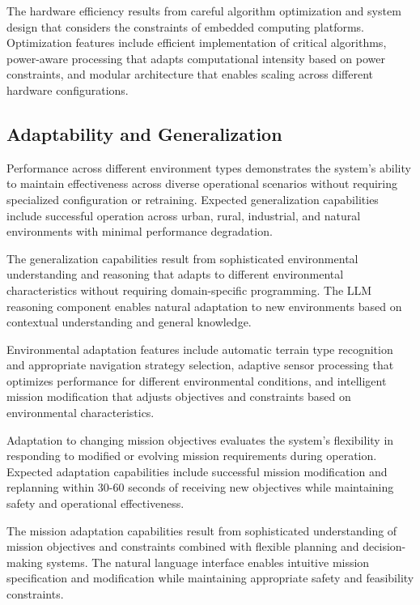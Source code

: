 The hardware efficiency results from careful algorithm optimization and system design that considers the constraints of embedded computing platforms. Optimization features include efficient implementation of critical algorithms, power-aware processing that adapts computational intensity based on power constraints, and modular architecture that enables scaling across different hardware configurations.

\subsection{Adaptability and Generalization}

Performance across different environment types demonstrates the system's ability to maintain effectiveness across diverse operational scenarios without requiring specialized configuration or retraining. Expected generalization capabilities include successful operation across urban, rural, industrial, and natural environments with minimal performance degradation.

The generalization capabilities result from sophisticated environmental understanding and reasoning that adapts to different environmental characteristics without requiring domain-specific programming. The LLM reasoning component enables natural adaptation to new environments based on contextual understanding and general knowledge.

Environmental adaptation features include automatic terrain type recognition and appropriate navigation strategy selection, adaptive sensor processing that optimizes performance for different environmental conditions, and intelligent mission modification that adjusts objectives and constraints based on environmental characteristics.

Adaptation to changing mission objectives evaluates the system's flexibility in responding to modified or evolving mission requirements during operation. Expected adaptation capabilities include successful mission modification and replanning within 30-60 seconds of receiving new objectives while maintaining safety and operational effectiveness.

The mission adaptation capabilities result from sophisticated understanding of mission objectives and constraints combined with flexible planning and decision-making systems. The natural language interface enables intuitive mission specification and modification while maintaining appropriate safety and feasibility constraints.

